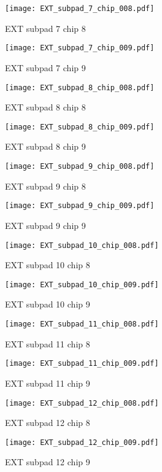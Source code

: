 \documentclass[a4paper,11pt]{article}
\begin{document}
\begin{figure}[htbp] \centering\texttt{[image: EXT\_subpad\_7\_chip\_008.pdf]}\caption{EXT subpad 7 chip 8} \end{figure} 
\begin{figure}[htbp] \centering\texttt{[image: EXT\_subpad\_7\_chip\_009.pdf]}\caption{EXT subpad 7 chip 9} \end{figure} 
\begin{figure}[htbp] \centering\texttt{[image: EXT\_subpad\_8\_chip\_008.pdf]}\caption{EXT subpad 8 chip 8} \end{figure} 
\begin{figure}[htbp] \centering\texttt{[image: EXT\_subpad\_8\_chip\_009.pdf]}\caption{EXT subpad 8 chip 9} \end{figure} 
\begin{figure}[htbp] \centering\texttt{[image: EXT\_subpad\_9\_chip\_008.pdf]}\caption{EXT subpad 9 chip 8} \end{figure} 
\begin{figure}[htbp] \centering\texttt{[image: EXT\_subpad\_9\_chip\_009.pdf]}\caption{EXT subpad 9 chip 9} \end{figure} 
\begin{figure}[htbp] \centering\texttt{[image: EXT\_subpad\_10\_chip\_008.pdf]}\caption{EXT subpad 10 chip 8} \end{figure} 
\begin{figure}[htbp] \centering\texttt{[image: EXT\_subpad\_10\_chip\_009.pdf]}\caption{EXT subpad 10 chip 9} \end{figure} 
\begin{figure}[htbp] \centering\texttt{[image: EXT\_subpad\_11\_chip\_008.pdf]}\caption{EXT subpad 11 chip 8} \end{figure} 
\begin{figure}[htbp] \centering\texttt{[image: EXT\_subpad\_11\_chip\_009.pdf]}\caption{EXT subpad 11 chip 9} \end{figure} 
\begin{figure}[htbp] \centering\texttt{[image: EXT\_subpad\_12\_chip\_008.pdf]}\caption{EXT subpad 12 chip 8} \end{figure} 
\begin{figure}[htbp] \centering\texttt{[image: EXT\_subpad\_12\_chip\_009.pdf]}\caption{EXT subpad 12 chip 9} \end{figure}
\end{document}
